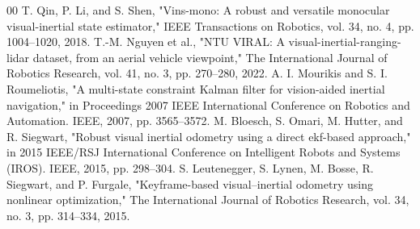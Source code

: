 \documentclass[conference]{IEEEtran}
\begin{document}
\begin{thebibliography}{00}
 T. Qin, P. Li, and S. Shen, "Vins-mono: A robust and versatile monocular visual-inertial state estimator," IEEE Transactions on Robotics, vol. 34, no. 4, pp. 1004–1020, 2018.
 T.-M. Nguyen et al., "NTU VIRAL: A visual-inertial-ranging-lidar dataset, from an aerial vehicle viewpoint," The International Journal of Robotics Research, vol. 41, no. 3, pp. 270–280, 2022.
 A. I. Mourikis and S. I. Roumeliotis, "A multi-state constraint Kalman filter for vision-aided inertial navigation," in Proceedings 2007 IEEE International Conference on Robotics and Automation. IEEE, 2007, pp. 3565–3572.
 M. Bloesch, S. Omari, M. Hutter, and R. Siegwart, "Robust visual inertial odometry using a direct ekf-based approach," in 2015 IEEE/RSJ International Conference on Intelligent Robots and Systems (IROS). IEEE, 2015, pp. 298–304.
 S. Leutenegger, S. Lynen, M. Bosse, R. Siegwart, and P. Furgale, "Keyframe-based visual–inertial odometry using nonlinear optimization," The International Journal of Robotics Research, vol. 34, no. 3, pp. 314–334, 2015.
\end{thebibliography}
\end{document}
